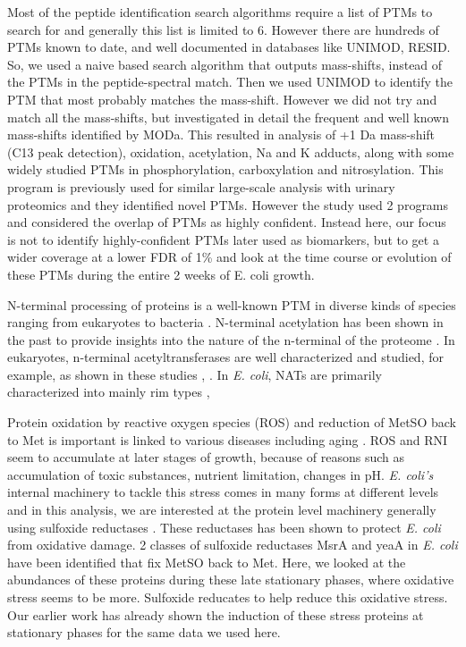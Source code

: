 \documentclass[12pt]{article}
\begin{document}
Most of the peptide identification search algorithms require a list of PTMs to search for and generally this list is limited to 6. However there are hundreds of PTMs known to date, and well documented in databases like UNIMOD, RESID. So, we used a naive based search algorithm that outputs mass-shifts, instead of the PTMs in the peptide-spectral match. Then we used UNIMOD to identify the PTM that most probably matches the mass-shift. However we did not try and match all the mass-shifts, but investigated in detail the frequent and well known mass-shifts identified by MODa. This resulted in analysis of +1 Da mass-shift (C13 peak detection), oxidation, acetylation, Na and K adducts, along with some widely studied PTMs in phosphorylation, carboxylation and nitrosylation. This program is previously used for similar large-scale analysis with urinary proteomics and they identified novel PTMs. However the study used 2 programs and considered the overlap of PTMs as highly confident. Instead here, our focus is not to identify highly-confident PTMs later used as biomarkers, but to get a wider coverage at a lower FDR of 1\% and look at the time course or evolution of these PTMs during the entire 2 weeks of E. coli growth.

N-terminal processing of proteins is a well-known PTM in diverse kinds of species ranging from eukaryotes to bacteria \cite{Kimuraetal2003}. N-terminal acetylation has been shown in the past to provide insights into the nature of the n-terminal of the proteome \cite{Helbigetal2010}. In eukaryotes, n-terminal acetyltransferases are well characterized and studied, for example, as shown in these studies \cite{PolevodaSherman2003}, \cite{PolevodaSherman2003b}. In \emph{E. coli}, NATs are primarily characterized into mainly rim types \cite{Tanakaetal1989}, \cite{Yoshikawaetal1987}

Protein oxidation by reactive oxygen species (ROS) and reduction of MetSO back to Met is important is linked to various diseases including aging \cite{Stadtman1992}. ROS and RNI seem to accumulate at later stages of growth, because of reasons such as accumulation of toxic substances, nutrient limitation, changes in pH. \emph{E. coli's} internal machinery to tackle this stress comes in many forms at different levels and in this analysis, we are interested at the protein level machinery generally using sulfoxide reductases \cite{Brotetal1981} \cite{ZhangWeissbach2008}. These reductases has been shown to protect \emph{E. coli} from oxidative damage\cite{Ezratyetal2004}. 2 classes of sulfoxide reductases MsrA and yeaA in \emph{E. coli} have been identified that fix MetSO back to Met. Here, we looked at the abundances of these proteins during these late stationary phases, where oxidative stress seems to be more. Sulfoxide reducates to help reduce this oxidative stress. Our earlier work has already shown the induction of these stress proteins at stationary phases for the same data we used here.
\end{document}
